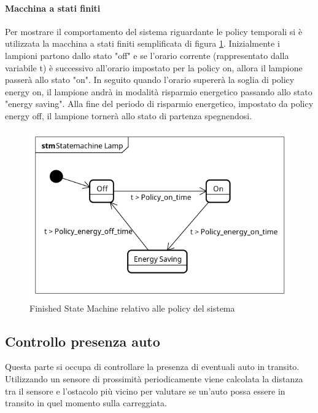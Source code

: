 \paragraph{Macchina a stati finiti}
Per mostrare il comportamento del sistema riguardante le policy temporali si è utilizzata la macchina a stati finiti semplificata di figura \ref{FSM POLICY}.
Inizialmente i lampioni partono dallo stato "off" e se l'orario corrente (rappresentato dalla variabile t) è successivo all'orario impostato per la policy on, allora il lampione passerà allo stato "on". In seguito quando l'orario supererà la soglia di policy energy on, il lampione andrà in modalità risparmio energetico passando allo stato "energy saving".
Alla fine del periodo di risparmio energetico, impostato da policy energy off, il lampione tornerà allo stato di partenza spegnendosi.
\begin{figure}[ht]
	\centering
	\includegraphics[scale=.8]{figure/Statemachine_Lamp.png}
	\caption{Finished State Machine relativo alle policy del sistema \label{FSM POLICY}}
\end{figure}
\newpage

\subsection{Controllo presenza auto}
Questa parte si occupa di controllare la presenza di eventuali auto in transito. Utilizzando un sensore di prossimità periodicamente viene calcolata la distanza tra il sensore e l'ostacolo più vicino per valutare se un'auto possa essere in transito in quel momento sulla carreggiata.
